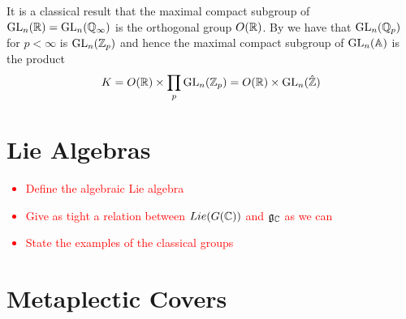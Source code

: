     \begin{example}[\(\GL_n(\A_\Q)\)]
        It is a classical result that the maximal compact subgroup of \(\GL_n(\R) = \GL_n(\Q_\infty)\) is the orthogonal group \(O(\R)\). By \cite[II.IV.A1]{serreLieAlgebrasLie1992} we have that \(\GL_n(\Q_p)\) for \(p<\infty\) is \(\GL_n(\Z_p)\) and hence the maximal compact subgroup of \(\GL_n(\A)\) is the product
        \[K = O(\R) \times \prod_p \GL_n(\Z_p) = O(\R) \times \GL_n(\hat{\Z})\]
    \end{example}

    \section{Lie Algebras}
    \textcolor{red}{\begin{itemize}
        \item Define the algebraic Lie algebra
        \item Give as tight a relation between \(Lie (G(\C))\) and \(\mathfrak{g}_\C\) as we can
        \item State the examples of the classical groups
    \end{itemize}}

    \section{Metaplectic Covers}